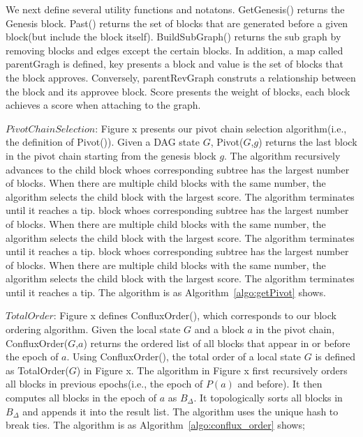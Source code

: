 We next define several utility functions and notatons. GetGenesis() returns the Genesis block. Past() returns the set of blocks that are generated before a given block(but include the block itself). BuildSubGraph() returns the sub graph by removing blocks and edges except the certain blocks.  In addition, a map called parentGragh is defined, key presents a block and value is the set of blocks that the block approves. Conversely, parentRevGraph construts a relationship between the block and its approvee block. Score presents the weight of blocks, each block achieves a score when attaching to the graph. 

$Pivot Chain Selection$: Figure x presents our pivot chain selection algorithm(i.e., the definition of Pivot()). Given a DAG state $G$, Pivot($G$,$g$) returns the last block in the pivot chain starting from the genesis block $g$. The algorithm recursively advances to the child block whoes corresponding subtree has the largest number of blocks. When there are multiple child blocks with the same number, the algorithm selects the child block with the largest score. The algorithm terminates until it reaches a tip. block whoes corresponding subtree has the largest number of blocks. When there are multiple child blocks with the same number, the algorithm selects the child block with the largest score. The algorithm terminates until it reaches a tip. block whoes corresponding subtree has the largest number of blocks. When there are multiple child blocks with the same number, the algorithm selects the child block with the largest score. The algorithm terminates until it reaches a tip. The algorithm is as Algorithm~\ref{algo:getPivot} shows.



$Total Order$: Figure x defines ConfluxOrder(), which corresponds to our block ordering algorithm. Given the local state $G$ and a block $a$ in the pivot chain, ConfluxOrder($G$,$a$) returns the ordered list of all blocks that appear in or before the epoch of $a$. Using ConfluxOrder(), the total order of a local state $G$ is defined as TotalOrder($G$) in Figure x. The algorithm in Figure x first recursively orders all blocks in previous epochs(i.e., the epoch of $P(a)$ and before). It then computes all blocks in the epoch of $a$ as $B_\Delta$. It topologically sorts all blocks in $B_\Delta$ and appends it into the result list. The algorithm uses the unique hash to break ties. The algorithm is as Algorithm~\ref{algo:conflux_order} shows;

